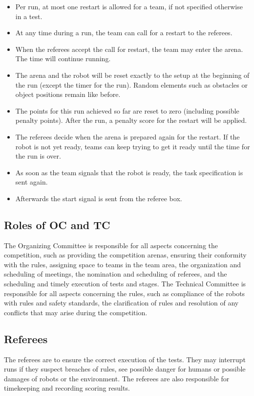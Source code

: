 \begin{itemize}

	\item Per run, at most one restart is allowed for a team, if not specified 			otherwise in a test.
	\item At any time during a run, the team can call for a restart to the 				referees.
	\item When the referees accept the call for restart, the team may enter the 			arena. The time will continue running.
	\item The arena and the robot will be reset exactly to the setup at the 				beginning of the run (except the timer for the run). Random elements such as 			obstacles or object positions remain like before.
	\item The points for this run achieved so far are reset to zero (including 			possible penalty points). After the run, a penalty score for the restart will 	be applied.
	\item The referees decide when the arena is prepared again for the restart. If 	the robot is not yet ready, teams can keep trying to get it ready until the 			time for the run is over.
	\item As soon as the team signals that the robot is ready, the task 					specification is sent again.
	\item Afterwards the start signal is sent from the referee box.
	
\end{itemize}

\subsection{Roles of OC and TC}
The Organizing Committee is responsible for all aspects concerning the competition, such as providing the competition arenas, ensuring their conformity with the rules, assigning space to teams in the team area, the organization and scheduling of meetings, the nomination and scheduling of referees, and the scheduling and timely execution of tests and stages. 
The Technical Committee is responsible for all aspects concerning the rules, such as compliance of the robots with rules and safety standards, the clarification of rules and resolution of any conflicts that may arise during the competition. 

\subsection{Referees}
The referees are to ensure the correct execution of the tests. They may interrupt runs if they suspect breaches of rules, see possible danger for humans or possible damages of robots or the environment. The referees are also responsible for timekeeping and recording scoring results. 

